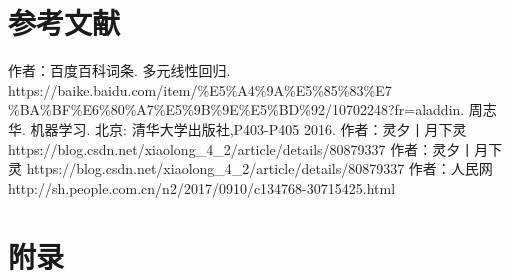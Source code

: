 \documentclass[a4paper]{article}
\begin{document}
	\section{参考文献}
		\begin{thebibliography}{a}
			 作者：百度百科词条. 多元线性回归. \\
			https://baike.baidu.com/item/\%E5\%A4\%9A\%E5\%85\%83\%E7 \\
			\%BA\%BF\%E6\%80\%A7\%E5\%9B\%9E\%E5\%BD\%92/10702248?fr=aladdin.
			  周志华. 机器学习. 北京: 清华大学出版社,P403-P405 2016.
			   作者：灵夕丨月下灵 https://blog.csdn.net/xiaolong_4_2/article/details/80879337
			   作者：灵夕丨月下灵 https://blog.csdn.net/xiaolong_4_2/article/details/80879337
			   作者：人民网 http://sh.people.com.cn/n2/2017/0910/c134768-30715425.html
			
		
		\end{thebibliography}
	\section{附录}
\end{document}

